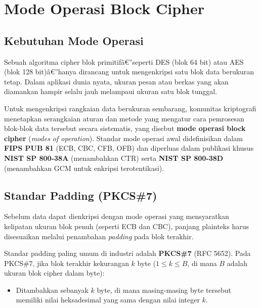 ﻿\section{Mode Operasi Block Cipher}

\subsection{Kebutuhan Mode Operasi}

Sebuah algoritma cipher blok primitifâ€”seperti DES (blok 64 bit) atau AES (blok 128 bit)â€”hanya dirancang untuk mengenkripsi satu blok data berukuran tetap. Dalam aplikasi dunia nyata, ukuran pesan atau berkas yang akan diamankan hampir selalu jauh melampaui ukuran satu blok tunggal.

Untuk mengenkripsi rangkaian data berukuran sembarang, komunitas kriptografi menetapkan serangkaian aturan dan metode yang mengatur cara pemrosesan blok-blok data tersebut secara sistematis, yang disebut \textbf{mode operasi block cipher} (\textit{modes of operation}). Standar mode operasi awal didefinisikan dalam \textbf{FIPS PUB 81} (ECB, CBC, CFB, OFB) dan diperluas dalam publikasi khusus \textbf{NIST SP 800-38A} (menambahkan CTR) serta \textbf{NIST SP 800-38D} (menambahkan GCM untuk enkripsi terotentikasi).

\subsection{Standar Padding (PKCS\#7)}

Sebelum data dapat dienkripsi dengan mode operasi yang mensyaratkan kelipatan ukuran blok penuh (seperti ECB dan CBC), panjang plainteks harus disesuaikan melalui penambahan \textit{padding} pada blok terakhir.

Standar padding paling umum di industri adalah \textbf{PKCS\#7} (RFC 5652). Pada PKCS\#7, jika blok terakhir kekurangan $k$ byte ($1 \le k \le B$, di mana $B$ adalah ukuran blok cipher dalam byte):
\begin{itemize}
  \item Ditambahkan sebanyak $k$ byte, di mana masing-masing byte tersebut memiliki nilai heksadesimal yang sama dengan nilai integer $k$.
\end{itemize}


